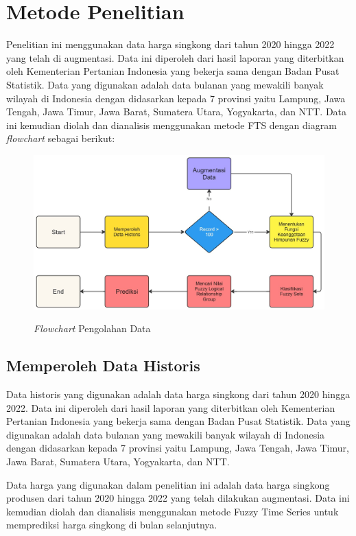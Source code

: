 \documentclass[conference]{IEEEtran}
\begin{document}
\section{Metode Penelitian}

Penelitian ini menggunakan data harga singkong dari tahun 2020 hingga 2022 yang telah di augmentasi. Data ini diperoleh dari hasil laporan yang diterbitkan oleh Kementerian Pertanian Indonesia yang bekerja sama dengan Badan Pusat Statistik. Data yang digunakan adalah data bulanan yang mewakili banyak wilayah di Indonesia dengan didasarkan kepada 7 provinsi yaitu Lampung, Jawa Tengah, Jawa Timur, Jawa Barat, Sumatera Utara, Yogyakarta, dan NTT. Data ini kemudian diolah dan dianalisis menggunakan metode FTS dengan diagram \textit{flowchart} sebagai berikut:

\begin{figure}[H]
    \centering
    {\includegraphics[width=0.7\columnwidth, center]{images/Flowchart FTS.jpg}} 
    \caption{\textit{Flowchart} Pengolahan Data}
\end{figure}


\subsection{Memperoleh Data Historis}
Data historis yang digunakan adalah data harga singkong dari tahun 2020 hingga 2022. Data ini diperoleh dari hasil laporan yang diterbitkan oleh Kementerian Pertanian Indonesia yang bekerja sama dengan Badan Pusat Statistik. Data yang digunakan adalah data bulanan yang mewakili banyak wilayah di Indonesia dengan didasarkan kepada 7 provinsi yaitu Lampung, Jawa Tengah, Jawa Timur, Jawa Barat, Sumatera Utara, Yogyakarta, dan NTT.

Data harga yang digunakan dalam penelitian ini adalah data harga singkong produsen dari tahun 2020 hingga 2022 yang telah dilakukan augmentasi. Data ini kemudian diolah dan dianalisis menggunakan metode Fuzzy Time Series untuk memprediksi harga singkong di bulan selanjutnya.
\end{document}
